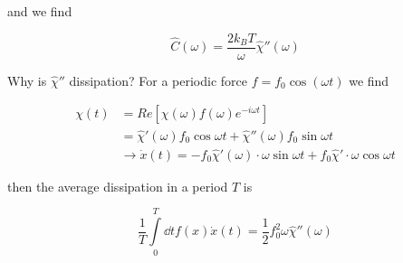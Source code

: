 and we find

\begin{equation}
	\hat C(\omega) = \frac{2k_BT}{\omega}\hat\chi''(\omega)
\end{equation}

Why is $\hat\chi''$ dissipation? For a periodic force $f = f_0\cos(\omega t)$ we find

\begin{align}
	\chi (t) &= Re[\chi(\omega)f(\omega)e^{-i\omega t}]\\
	&= \hat \chi'(\omega)f_0\cos\omega t+\hat\chi''(\omega)f_0\sin\omega t\\
	&\rightarrow \dot x(t) = -f_0\hat\chi'(\omega)\cdot\omega\sin\omega t+f_0\hat\chi'\cdot\omega\cos\omega t
\end{align}

then the average dissipation in a period $T$ is

\begin{equation}
	\frac{1}{T}\int\limits_0^T\dd t f(x)\dot x(t) = \frac{1}{2}f_0^2\omega\hat\chi''(\omega)
\end{equation}